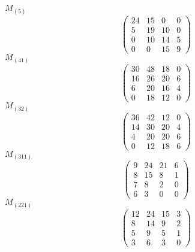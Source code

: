 \documentclass[12pt,reqno]{amsart}
\begin{document}
\Large
$M_{(5)}$                             $$ \begin{pmatrix} 
                          24 & 15 & 0 & 0 \\[6pt]
                          5 & 19 & 10 & 0 \\[6pt]
                          0 & 10 & 14 & 5 \\[6pt]
                            0 & 0 & 15 & 9
                              \end{pmatrix} $$ 
$M_{(41)}$                             $$ \begin{pmatrix} 
                         30 & 48 & 18 & 0 \\[6pt]
                         16 & 26 & 20 & 6 \\[6pt]
                          6 & 20 & 16 & 4 \\[6pt]
                            0 & 18 & 12 & 0
                              \end{pmatrix} $$ 
$M_{(32)}$                             $$ \begin{pmatrix} 
                         36 & 42 & 12 & 0 \\[6pt]
                         14 & 30 & 20 & 4 \\[6pt]
                          4 & 20 & 20 & 6 \\[6pt]
                            0 & 12 & 18 & 6
                              \end{pmatrix} $$ 
$M_{(311)}$                             $$ \begin{pmatrix} 
                          9 & 24 & 21 & 6 \\[6pt]
                          8 & 15 & 8 & 1 \\[6pt]
                           7 & 8 & 2 & 0 \\[6pt]
                             6 & 3 & 0 & 0
                              \end{pmatrix} $$ 
$M_{(221)}$                             $$ \begin{pmatrix} 
                         12 & 24 & 15 & 3 \\[6pt]
                          8 & 14 & 9 & 2 \\[6pt]
                           5 & 9 & 5 & 1 \\[6pt]
                             3 & 6 & 3 & 0
                              \end{pmatrix} $$ 
\end{document}
